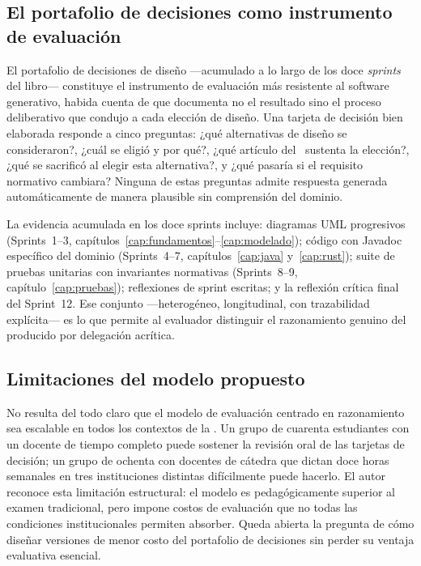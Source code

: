 \endgroup

\subsection{El portafolio de decisiones como instrumento de evaluación}
\label{subsec:portafolio}

El portafolio de decisiones de diseño —acumulado a lo largo de los doce
\textit{sprints} del libro— constituye el instrumento de evaluación más
resistente al software generativo, habida cuenta de que documenta no el
resultado sino el proceso deliberativo que condujo a cada elección de diseño.
Una tarjeta de decisión bien elaborada responde a cinco preguntas: ¿qué
alternativas de diseño se consideraron?, ¿cuál se eligió y por qué?, ¿qué
artículo del \acuerdo\ sustenta la elección?, ¿qué se sacrificó al elegir
esta alternativa?, y ¿qué pasaría si el requisito normativo cambiara? Ninguna
de estas preguntas admite respuesta generada automáticamente de manera
plausible sin comprensión del dominio.

La evidencia acumulada en los doce sprints incluye: diagramas UML progresivos
(Sprints~1--3, capítulos~\ref{cap:fundamentos}--\ref{cap:modelado}); código
con Javadoc específico del dominio (Sprints~4--7, capítulos~\ref{cap:java}
y~\ref{cap:rust}); suite de pruebas unitarias con invariantes normativas
(Sprints~8--9, capítulo~\ref{cap:pruebas}); reflexiones de sprint escritas;
y la reflexión crítica final del Sprint~12. Ese conjunto ---heterogéneo,
longitudinal, con trazabilidad explícita--- es lo que permite al evaluador
distinguir el razonamiento genuino del producido por delegación acrítica.

\subsection{Limitaciones del modelo propuesto}
\label{subsec:limitaciones-evaluacion}

No resulta del todo claro que el modelo de evaluación centrado en razonamiento
sea escalable en todos los contextos de la \ud. Un grupo de cuarenta estudiantes
con un docente de tiempo completo puede sostener la revisión oral de las tarjetas
de decisión; un grupo de ochenta con docentes de cátedra que dictan doce horas
semanales en tres instituciones distintas difícilmente puede hacerlo. El autor
reconoce esta limitación estructural: el modelo es pedagógicamente superior
al examen tradicional, pero impone costos de evaluación que no todas las
condiciones institucionales permiten absorber. Queda abierta la pregunta de cómo
diseñar versiones de menor costo del portafolio de decisiones sin perder su
ventaja evaluativa esencial.

